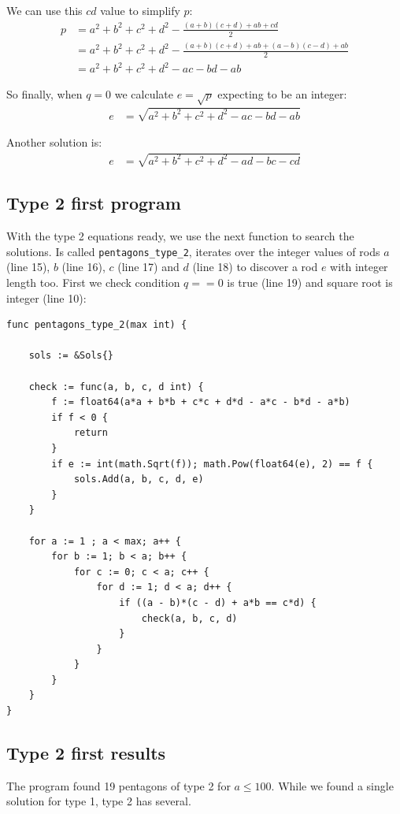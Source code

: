 \documentclass[11pt]{article}
\begin{document}
We can use this $cd$ value to simplify $p$:
\begin{align*}
p &= a^2+b^2+c^2+d^2 - \frac{(a+b)(c+d)+ab+cd}{2}\\
  &= a^2+b^2+c^2+d^2 - \frac{(a+b)(c+d)+ab+(a-b)(c-d)+ab}{2}\\
  &= a^2+b^2+c^2+d^2 -ac -bd -ab
\end{align*}

So finally, when $q=0$ we calculate $e = \sqrt{p}$ expecting to be an integer:
\begin{align*}
e &= \sqrt{a^2 + b^2 + c^2 + d^2 -ac -bd - ab}
\end{align*}

Another solution is:
\begin{align*}
e &= \sqrt{a^2 + b^2 + c^2 + d^2 -ad -bc - cd}
\end{align*}


\subsection{Type 2 first program}

With the type 2 equations ready, we use the next function to search the solutions.
Is called \texttt{pentagons\_type\_2}, iterates over the integer values of rods 
$a$ (line 15), $b$ (line 16), $c$ (line 17) and $d$ (line 18)
to discover a rod $e$ with integer length too. First we check condition $q == 0$ is
true (line 19) and square root is integer (line 10):
\begin{lstlisting}
func pentagons_type_2(max int) {

	sols := &Sols{}

	check := func(a, b, c, d int) {
		f := float64(a*a + b*b + c*c + d*d - a*c - b*d - a*b)
	    if f < 0 {
	    	return
	    }
		if e := int(math.Sqrt(f)); math.Pow(float64(e), 2) == f {
			sols.Add(a, b, c, d, e)
		}
	}

    for a := 1 ; a < max; a++ {
    	for b := 1; b < a; b++ {
        	for c := 0; c < a; c++ {
          		for d := 1; d < a; d++ {
            		if ((a - b)*(c - d) + a*b == c*d) {
              			check(a, b, c, d)
              		}
              	}
            }
        }
    }
}
\end{lstlisting}

\subsection{Type 2 first results}
The program found 19 pentagons of type 2 for $a \leq 100$.
While we found a single solution for type 1, type 2 has several.
\end{document}
